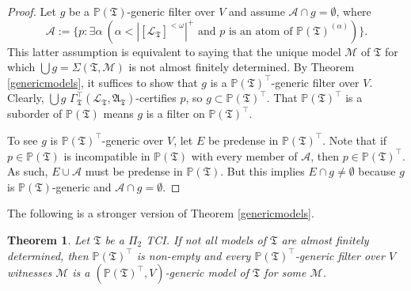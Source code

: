 \documentclass[12pt, twoside]{memoir}
\numberwithin{equation}{section}
\newtheorem{thm}{Theorem}[section]
\theoremstyle{definition}
\theoremstyle{remark}
\theoremstyle{definition}
\theoremstyle{definition}
\theoremstyle{definition}
\theoremstyle{remark}
\begin{document}
\begin{proof}
Let $g$ be a $\mathbb{P}(\mathfrak{T})$-generic filter over $V$ and assume $\mathcal{A} \cap g = \emptyset$, where $$\mathcal{A} := \{p : \exists \alpha \ (\alpha < |[\mathcal{L}_{\mathfrak{T}}]^{< \omega}|^+ \text{ and } p \text{ is an atom of } \mathbb{P}(\mathfrak{T})^{(\alpha)})\}.$$ This latter assumption is equivalent to saying that the unique model $\mathcal{M}$ of $\mathfrak{T}$ for which $\bigcup g = \Sigma(\mathfrak{T}, \mathcal{M})$ is not almost finitely determined. By Theorem \ref{genericmodels}, it suffices to show that $g$ is a $\mathbb{P}(\mathfrak{T})^{\top}$-generic filter over $V$. Clearly, $\bigcup g$ $\Gamma_{\mathfrak{T}}^{\top} (\mathcal{L}_{\mathfrak{T}}, \mathfrak{A}_{\mathfrak{T}})$-certifies $p$, so $g \subset \mathbb{P}(\mathfrak{T})^{\top}$. That $\mathbb{P}(\mathfrak{T})^{\top}$ is a suborder of $\mathbb{P}(\mathfrak{T})$ means $g$ is a filter on $\mathbb{P}(\mathfrak{T})^{\top}$.

To see $g$ is $\mathbb{P}(\mathfrak{T})^{\top}$-generic over $V$, let $E$ be predense in $\mathbb{P}(\mathfrak{T})^{\top}$. Note that if $p \in \mathbb{P}(\mathfrak{T})$ is incompatible in $\mathbb{P}(\mathfrak{T})$ with every member of $\mathcal{A}$, then $p \in \mathbb{P}(\mathfrak{T})^{\top}$. As such, $E \cup \mathcal{A}$ must be predense in $\mathbb{P}(\mathfrak{T})$. But this implies $E \cap g \neq \emptyset$ because $g$ is $\mathbb{P}(\mathfrak{T})$-generic and $\mathcal{A} \cap g = \emptyset$.
\end{proof}

The following is a stronger version of Theorem \ref{genericmodels}.

\begin{thm}\label{genericdichom}
Let $\mathfrak{T}$ be a $\Pi_2$ TCI. If not all models of $\mathfrak{T}$ are almost finitely determined, then $\mathbb{P}(\mathfrak{T})^{\top}$ is non-empty and every $\mathbb{P}(\mathfrak{T})^{\top}$-generic filter over $V$ witnesses $\mathcal{M}$ is a $(\mathbb{P}(\mathfrak{T})^{\top}, V)$-generic model of $\mathfrak{T}$ for some $\mathcal{M}$.
\end{thm}
\end{document}
